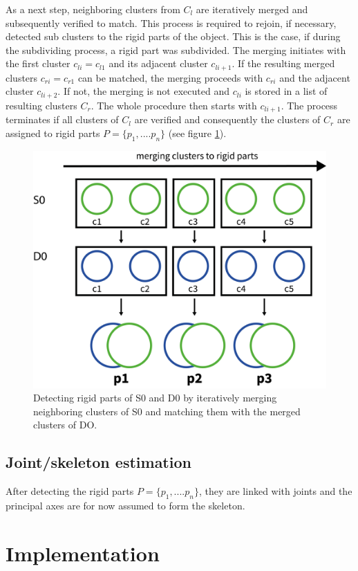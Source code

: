 \documentclass[a4paper,english,11pt]{report}
\begin{document}
As a next step, neighboring clusters from $C_l$ are iteratively merged and subsequently verified to match. This process is required to rejoin, if necessary, detected sub clusters to the rigid parts of the object. This is the case, if during the subdividing process, a rigid part was subdivided. The merging initiates with the first cluster $c_{li} = c_{l1}$ and its adjacent cluster $c_{li+1}$. If the resulting merged clusters $c_{ri} = c_{r1}$ can be matched, the merging proceeds with $c_{ri}$ and the adjacent cluster $c_{li+2}$. If not, the merging is not executed and $c_{li}$ is stored in a list of resulting clusters $C_r$. The whole procedure then starts with $c_{li+1}$. The process terminates if all clusters of $C_l$ are verified and consequently the clusters of $C_r$ are assigned to rigid parts $ P =  \{ {p_1,....p_n}\}$ (see figure \ref{fig:clusterChain}). 

\begin{figure}
	\centering
	\includegraphics[width=0.7\linewidth]{ClusterChain}
	\caption{Detecting rigid parts of S0 and D0 by iteratively merging neighboring clusters of S0 and matching them with the merged clusters of DO.}
	\label{fig:clusterChain}
\end{figure}

\subsection{Joint/skeleton estimation}

After detecting the rigid parts $ P =  \{ {p_1,....p_n}\}$, they are linked with joints and the principal axes are for now assumed to form the skeleton. 

\section{Implementation}
\end{document}
